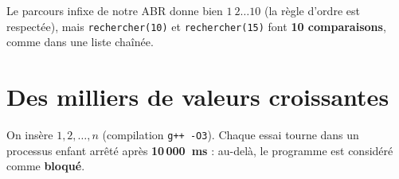 \documentclass[11pt,a4paper]{article}
\begin{document}
Le parcours infixe de notre ABR donne bien $1\ 2 \dots 10$ (la règle d'ordre est respectée),
mais \texttt{rechercher(10)} et \texttt{rechercher(15)} font \textbf{10 comparaisons},
comme dans une liste chaînée.

\section{Des milliers de valeurs croissantes}

On insère $1, 2, \dots, n$ (compilation \texttt{g++ -O3}). Chaque essai tourne dans un
processus enfant arrêté après \textbf{10\,000~ms} : au-delà, le programme est considéré
comme \textbf{bloqué}.
\end{document}
